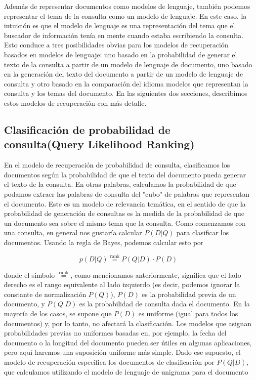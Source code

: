 Además de representar documentos como modelos de lenguaje, también podemos representar el tema de la consulta como un modelo de lenguaje. En este caso, la intuición es que el modelo de lenguaje es una representación del tema que el buscador de información tenía en mente cuando estaba escribiendo la consulta. Esto conduce a tres posibilidades obvias para los modelos de recuperación basados ​​en modelos de lenguaje: uno basado en la probabilidad de generar el texto de la consulta a partir de un modelo de lenguaje de documento, uno basado en la generación del texto del documento a partir de un modelo de lenguaje de consulta y otro basado en la comparación del idioma modelos que representan la consulta y los temas del documento. En las siguientes dos secciones, describimos estos modelos de recuperación con más detalle.

\subsection{Clasificación de probabilidad de consulta(Query Likelihood Ranking)}

En el modelo de recuperación de probabilidad de consulta, clasificamos los documentos según la probabilidad de que el texto del documento pueda generar el texto de la consulta. En otras palabras, calculamos la probabilidad de que podamos extraer las palabras de consulta del "cubo" de palabras que representan el documento. Este es un modelo de relevancia temática, en el sentido de que la probabilidad de generación de consultas es la medida de la probabilidad de que un documento sea sobre el mismo tema que la consulta. Como comenzamos con una consulta, en general nos gustaría calcular $P (D | Q)$ para clasificar los documentos. Usando la regla de Bayes, podemos calcular esto por

$$p(D|Q)\stackrel{\mathrm{rank}}{=}P(Q|D)\cdot P(D)$$

donde el simbolo $\stackrel{\mathrm{rank}}{=}$, como mencionamos anteriormente, significa que el lado derecho es el rango equivalente al lado izquierdo (es decir, podemos ignorar la constante de normalización $P (Q)$), $P (D)$ es la probabilidad previa de un documento, y $P (Q | D)$ es la probabilidad de consulta dada el documento. En la mayoría de los casos, se supone que $P (D)$ es uniforme (igual para todos los documentos) y, por lo tanto, no afectará la clasificación. Los modelos que asignan probabilidades previas no uniformes basadas en, por ejemplo, la fecha del documento o la longitud del documento pueden ser útiles en algunas aplicaciones, pero aquí haremos una suposición uniforme más simple. Dado ese supuesto, el modelo de recuperación especifica los documentos de clasificación por $P (Q | D)$, que calculamos utilizando el modelo de lenguaje de unigrama para el documento

